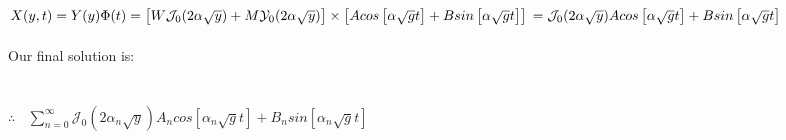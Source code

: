 \documentclass[fleqn]{article}
\begin{document}
\begin{enumerate}
\begin{enumerate}
{          \\
          $
            X(y,t)=Y(y)\Phi(t)=\left[W \mathcal{J}_0(2 \alpha \sqrt{y}) +M \mathcal{Y}_0(2 \alpha \sqrt{y})\right] \times \left[Acos\left[\alpha \sqrt{g}t\right]+B sin\left[\alpha \sqrt{g}t\right]\right] \\
            \\
            =\mathcal{J}_0(2 \alpha \sqrt{y}) Acos\left[\alpha \sqrt{g}t\right]+B sin\left[\alpha \sqrt{g}t\right] \\
            \\
            \\
          $
          \\
          \\
          Our final solution is: \\
          \\
          \\
          $
            \therefore ~~~~ \sum\limits_{n=0}^{\infty} \mathcal{J}_0(2 \alpha_n \sqrt{y}) A_n cos\left[\alpha_n \sqrt{g}t\right]+B_n sin\left[\alpha_n \sqrt{g}t\right]
          $
        }

    \end{enumerate}
    
    
  \end{enumerate}
\end{document}
